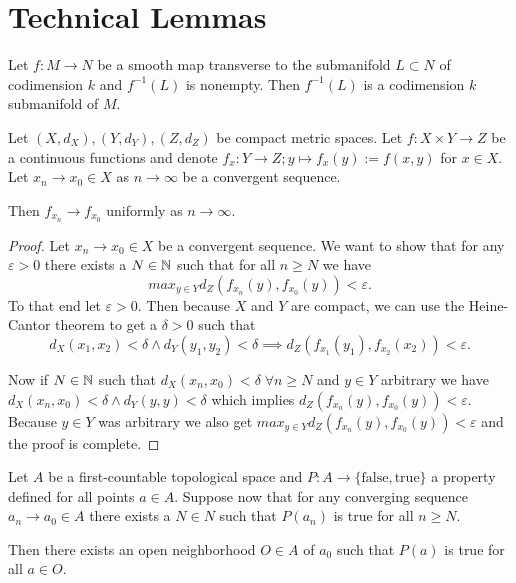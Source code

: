 \chapter{Technical Lemmas}

\begin{lemma}\label{lem:transmap}
    Let $f:M\to N$ be a smooth map transverse to the submanifold $L\subset N$ of codimension $k$ and $f^{-1}(L)$ is nonempty.
    Then $f^{-1}(L)$ is a codimension $k$ submanifold of $M$.
\end{lemma}


\begin{lemma}\label{lem:unifconvoncompact}
    Let $(X,d_X),(Y,d_Y),(Z,d_Z)$ be compact metric spaces. Let $f:X\times Y\to Z$ be a continuous functions and denote $f_x:Y\to Z;y\mapsto f_x(y):=f(x,y)$ for $x\in X$. Let $x_n\to x_0 \in X$ as $n\to\infty$ be a convergent sequence.

    Then $f_{x_n}\to f_{x_0}$ uniformly as $n\to \infty$.
\end{lemma}
\begin{proof}
    Let $x_n\to x_0\in X$ be a convergent sequence. We want to show that for any $\varepsilon > 0$ there exists a $N\in \mathbb{N}$ such that for all $n \ge N$ we have 
    \[
        max_{y\in Y} d_Z(f_{x_n}(y),f_{x_0}(y))<\varepsilon.
    \]
    To that end let $\varepsilon>0$. Then because $X$ and $Y$ are compact, we can use the Heine-Cantor theorem to get a $\delta>0$ such that 
    \[
        d_X(x_1,x_2)<\delta \wedge d_Y(y_1,y_2)<\delta \implies d_Z(f_{x_1}(y_1),f_{x_2}(x_2))<\varepsilon.
    \]

    Now if $N\in \mathbb{N}$ such that $d_X(x_n,x_0)<\delta \; \forall n\ge N$ and $y\in Y$ arbitrary we have 
    $d_X(x_n,x_0)<\delta \wedge d_Y(y,y)<\delta$ which implies $d_Z(f_{x_n}(y),f_{x_0}(y))<\varepsilon$. Because $y\in Y$ was arbitrary we also get $max_{y\in Y} d_Z(f_{x_n}(y),f_{x_0}(y))<\varepsilon$ and the proof is complete.
\end{proof}


\begin{lemma}\label{lem:firstcount}
    Let $A$ be a first-countable topological space and $P:A\to \{\text{false},\text{true}\}$ a property defined for all points $a\in A$. Suppose now that for any converging sequence $a_n\to a_0\in A$ there exists a $N\in N$ such that $P(a_n)$ is true for all $n\ge N$.
    
    Then there exists an open neighborhood $O\in A$ of $a_0$ such that $P(a)$ is true for all $a\in O$.
\end{lemma}


